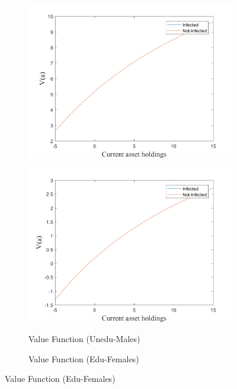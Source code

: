 \begin{figure}[H]
\begin{subfigure}{0.5\textwidth}
   \includegraphics[width=\linewidth,height = 0.22\textheight]{figures/mio/FIG13.png}
    \label{fig_dert}
\end{subfigure}
\hspace*{\fill}
\begin{subfigure}{0.5\textwidth}\caption{Value Function (Unedu-Males)}
   \includegraphics[width=\linewidth,height = 0.22\textheight]{figures/mio/FIG14.png}
    \label{fig:x_b}
\end{subfigure}
\bigskip
\begin{subfigure}{0.5\textwidth}\caption{Value Function (Edu-Females)}

\end{subfigure}
\end{figure}
